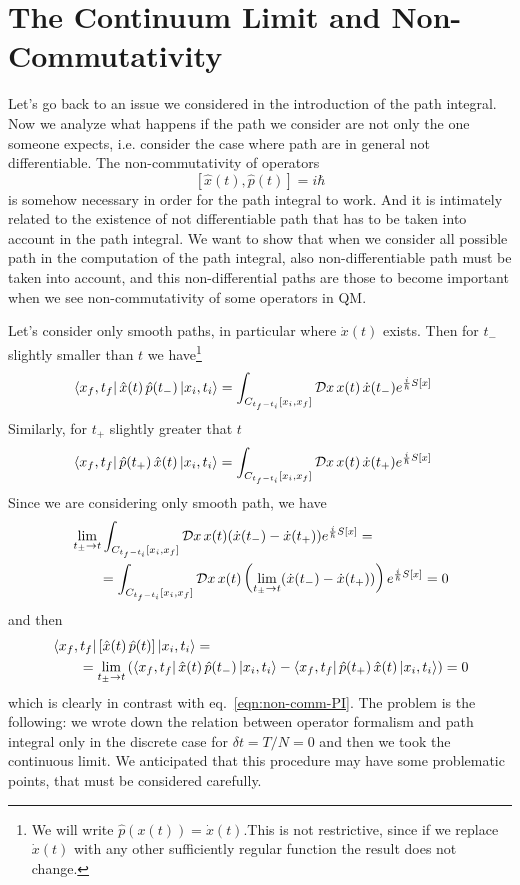 \documentclass[../main/main.tex]{subfiles}
\begin{document}
\section{The Continuum Limit and Non-Commutativity}

Let's go back to an issue we considered in the introduction of the path integral. Now we analyze what happens if the path we consider are not only the one someone expects, i.e. consider the case where path are in general not differentiable. The non-commutativity of operators
\begin{equation}\label{eqn:non-comm-PI}
[\hat x(t),\hat p(t)]=i\hbar
\end{equation}
is somehow necessary in order for the path integral to work.  And it is intimately related to the existence of not differentiable path that has to be taken into account in the path integral. We want to show that when we consider all possible path in the computation of the path integral, also non-differentiable path must be taken into account, and this non-differential paths are those to become important when we see non-commutativity of some operators in QM. 

Let's consider only smooth paths, in particular where $\dot x(t)$ exists. Then for $t_-$ slightly smaller than $t$ we have\footnote{We will write $\hat p(x(t))=\dot x(t)$.This is not restrictive, since if we replace $\dot x(t)$ with any other sufficiently regular function the result does not change.}
\begin{align*}
\bra{x_f,t_f}\hat x(t)\,\hat p(t_-)\ket{x_i,t_i}
&=\int_{C_{t_f-t_i}[x_i,x_f]}\mathcal Dx\,x(t)\,\dot x(t_-)e^{\frac i\hbar S[x]}
\end{align*}
Similarly, for $t_+$ slightly greater that $t$
\begin{align*}
\bra{x_f,t_f}\hat p(t_+)\,\hat x(t)\ket{x_i,t_i}
&=\int_{C_{t_f-t_i}[x_i,x_f]}\mathcal Dx\,x(t)\,\dot x(t_+)e^{\frac i\hbar S[x]}
\end{align*}
Since we are considering only smooth path, we have
\begin{align*}
&\lim_{t_\pm\to t}\int_{C_{t_f-t_i}[x_i,x_f]}\mathcal Dx\,x(t)(\dot x(t_-)-\dot x(t_+))e^{\frac i\hbar S[x]}=\\
&\qquad=\int_{C_{t_f-t_i}[x_i,x_f]}\mathcal Dx\,x(t)\left(\lim_{t_\pm\to t}(\dot x(t_-)-\dot x(t_+))\right)e^{\frac i\hbar S[x]}=0
\end{align*}
and then
\begin{align*}
&\bra{x_f,t_f}\left[\hat x(t)\,\hat p(t)\right]\ket{x_i,t_i}=\\
&\qquad=\lim_{t_\pm\to t}\left(\bra{x_f,t_f}\hat x(t)\,\hat p(t_-)\ket{x_i,t_i}-\bra{x_f,t_f}\hat p(t_+)\,\hat x(t)\ket{x_i,t_i}\right)=0
\end{align*}
which is clearly in contrast with eq.~\eqref{eqn:non-comm-PI}. The problem is the following: we wrote down the relation between operator formalism and path integral only in the discrete case for $\delta t=T/N=0$ and then we took the continuous limit. We anticipated that this procedure may have some problematic points, that must be considered carefully. 
\end{document}
